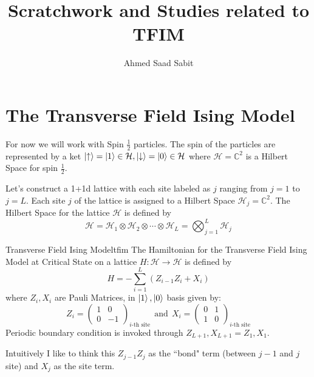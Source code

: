\documentclass[12pt]{article}        %
\title{Scratchwork and Studies related to TFIM}
\author{Ahmed Saad Sabit}
\affiliation{Department of Physics and Astronomy \\ Rice University, Houston, TX}
\begin{document}
 

\maketitle
\flushbottom


\section{The Transverse Field Ising Model}
For now we will work with Spin $\frac{1}{2}$ particles. The spin of the particles are represented by a ket $\ket{ \uparrow }  = \ket{1} \in \mathcal{H}, \ket{\downarrow} = \ket{0} \in \mathcal{H}$ where $\mathcal H = \mathbb C ^2$ is a Hilbert Space for spin $\frac{1}{2}$.

Let's construct a 1+1d lattice with each site labeled as $j$ ranging from $j=1$ to $j = L$. Each site $j$ of the lattice is assigned to a Hilbert Space $\mathcal H _j  = \mathbb C ^2 $. The Hilbert Space for the lattice $\mathcal H$ is defined by 
\begin{equation}
	\label{h-original}
	\mathcal H = \mathcal H_1 \otimes \mathcal H_2 \otimes \cdots \otimes \mathcal H_L = \bigotimes_{j = 1}^{L} \mathcal H_j
\end{equation}

\begin{definition}{Transverse Field Ising Model}{tfim}
	The Hamiltonian for the Transverse Field Ising Model at Critical State on a lattice $H : \mathcal H \to \mathcal H$ is defined by \[
	H	 = - \sum_{i = 1}^{L} (Z_{i-1} Z_{i} + X_{i} )
	\]
	where $Z_i, X_i$ are Pauli Matrices, in $\ket{1}, \ket{0}$ basis given by: 
	\[
	Z_i = 
	\begin{pmatrix} 1 & 0 \\ 0 &-1 \end{pmatrix}_{i\text{-th site}}  \ \ \text{and} \ \  
	X_i = 
	\begin{pmatrix} 0 & 1 \\ 1 & 0 \end{pmatrix}_{i\text{-th site}}
	\] 
	Periodic boundary condition is invoked through $Z_{L+1}, X_{L+1} = Z_1 , X_1$.
\end{definition}
Intuitively I like to think this $Z_{j-1} Z_{j}$ as the ``bond" term (between $j-1$ and $j$ site) and $X_j$ as the site term.
%
%
%
\end{document}
